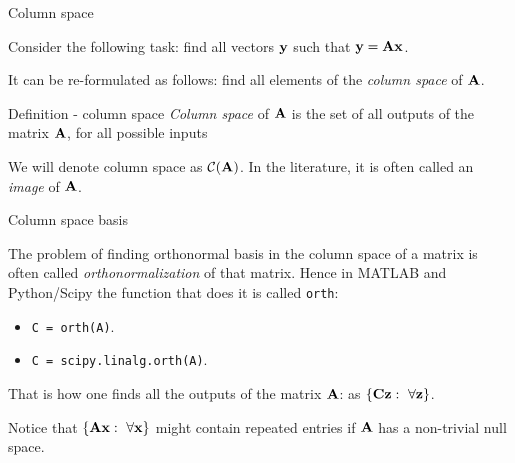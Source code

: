 \documentclass{beamer}
\begin{document}
\begin{frame}{Column space}
	\begin{flushleft}
		
		Consider the following task: find all vectors $\mathbf{y}$ such that $\mathbf{y} = \mathbf{A} \mathbf{x}$.
		
		\bigskip
		
		It can be re-formulated as follows: find all elements of the \emph{column space} of $\mathbf{A}$.
		
		\begin{block}{Definition - column space}
			\emph{Column space} of $\mathbf{A}$ is the set of all outputs of the matrix $\mathbf{A}$, for all possible inputs
		\end{block}
		
		\bigskip
		
		We will denote column space as $\mathcal{C}(\mathbf{A})$. In the literature, it is often called an \emph{image} of $\mathbf{A}$.
		
	\end{flushleft}
\end{frame}



\begin{frame}{Column space basis}
	\begin{flushleft}
		
		The problem of finding orthonormal basis in the column space of a matrix is often called \emph{orthonormalization} of that matrix. Hence in MATLAB and Python/Scipy the function that does it is called \texttt{orth}:
		
		\bigskip
		
		\begin{itemize}
			\item \texttt{C = orth(A)}.
			\item \texttt{C = scipy.linalg.orth(A)}.
		\end{itemize}
		
		\bigskip
		
		That is how one finds all the outputs of the matrix $\mathbf{A}$: as $\{ \mathbf{C}\mathbf{z}: \ \forall \mathbf{z} \}$. 
		
		Notice that $\{ \mathbf{A}\mathbf{x}: \ \forall \mathbf{x} \}$ might contain repeated entries if $\mathbf{A}$ has a non-trivial null space.
		
	\end{flushleft}
\end{frame}
\end{document}
